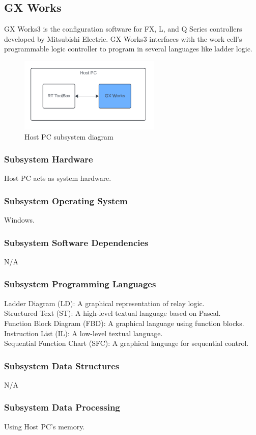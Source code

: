 \subsection{GX Works}
GX Works3 is the configuration software for FX, L, and Q Series controllers developed by Mitsubishi Electric. GX Works3  interfaces with the work cell's programmable logic controller to program in several languages like ladder logic.

\begin{figure}[h!]
	\centering
 	\includegraphics[width=0.60\textwidth]{images/GX_Works_Host.png}
 \caption{Host PC subsystem diagram}
\end{figure}

\subsubsection{Subsystem Hardware}
Host PC acts as system hardware.

\subsubsection{Subsystem Operating System}
Windows.

\subsubsection{Subsystem Software Dependencies}
N/A

\subsubsection{Subsystem Programming Languages}
Ladder Diagram (LD): A graphical representation of relay logic. \\
Structured Text (ST): A high-level textual language based on Pascal. \\
Function Block Diagram (FBD): A graphical language using function blocks. \\
Instruction List (IL): A low-level textual language. \\
Sequential Function Chart (SFC): A graphical language for sequential control.

\subsubsection{Subsystem Data Structures}
N/A

\subsubsection{Subsystem Data Processing}
Using Host PC's memory.